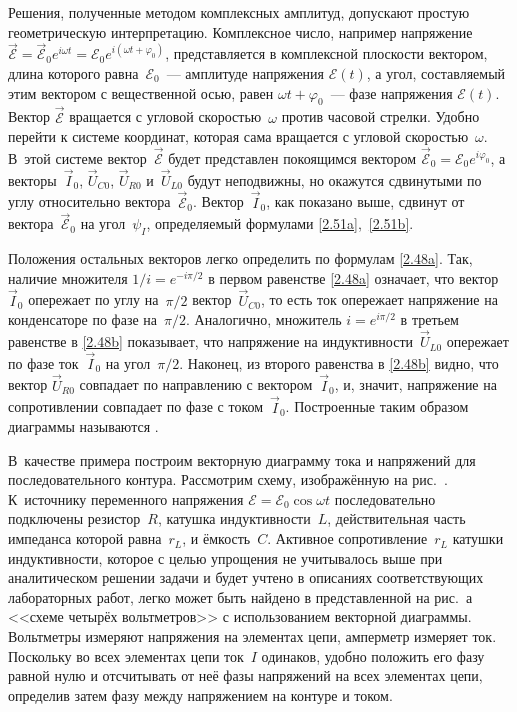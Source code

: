 Решения, полученные методом комплексных амплитуд, допускают простую
геометрическую интерпретацию. Комплексное число, например напряжение
$\vec{\mathcal{E}}=\vec{\mathcal{E}}_0e^{i\omega t}=\mathcal{E}_0e^{i(\omega
t+\varphi_0)}$, представляется в комплексной плоскости вектором, длина которого
равна~$\mathcal{E}_0$~--- амплитуде напряжения $\mathcal{E}(t)$, а угол,
составляемый этим вектором с вещественной осью, равен $\omega
t+\varphi_0$~--- фазе напряжения $\mathcal{E}(t)$. Вектор $\vec{\mathcal{E}}$
вращается с угловой скоростью~$\omega$ против часовой стрелки. Удобно перейти к
системе координат, которая сама вращается с угловой скоростью~$\omega$. В~этой
системе вектор~$\vec{\mathcal{E}}$ будет представлен покоящимся вектором
$\vec{\mathcal{E}}_0=\mathcal{E}_0e^{i\varphi_0}$, а векторы~$\vec I_0$, $\vec{U}_{\! C0}$,
$\vec{U}_{\! R0}$ и~$\vec{U}_{\! L0}$ будут неподвижны, но окажутся сдвинутыми по углу
относительно вектора~$\vec{\mathcal{E}}_0$. Вектор~$\vec I_0$, как показано выше,
сдвинут от вектора~$\vec{\mathcal{E}}_0$ на угол~$\psi_I$, определяемый формулами
\eqref{2.51a},~\eqref{2.51b}.

Положения остальных векторов легко определить по формулам \eqref{2.48a}. Так,
наличие множителя $1/i=e^{-i\pi/2}$ в первом равенстве \eqref{2.48a} означает,
что вектор~$\vec I_0$ опережает по углу на~$\pi/2$ вектор~$\vec{U}_{\! C0}$, то есть
ток опережает напряжение на конденсаторе по фазе на~$\pi/2$. Аналогично,
множитель $i=e^{i\pi/2}$ в третьем равенстве в \eqref{2.48b} показывает, что
напряжение на индуктивности~$\vec{U}_{\! L0}$ опережает по фазе ток~$\vec I_0$ на
угол~$\pi/2$. Наконец, из второго равенства в \eqref{2.48b} видно, что вектор
$\vec{U}_{\! R0}$ совпадает по направлению с вектором~$\vec I_0$, и, значит,
напряжение на сопротивлении совпадает по фазе с током~$\vec I_0$. Построенные
таким образом диаграммы называются .

В~качестве примера построим векторную диаграмму тока и напряжений для
последовательного контура. Рассмотрим схему, изображённую на рис.~.
К~источнику переменного напряжения $\mathcal{E}=\mathcal{E}_0\cos\omega t$
последовательно подключены резистор~$R$, катушка индуктивности~$L$,
действительная часть импеданса которой равна~$r_L$, и ёмкость~$C$. Активное
сопротивление~$r_L$ катушки индуктивности, которое с целью упрощения не
учитывалось выше при аналитическом решении задачи и будет учтено в описаниях
соответствующих лабораторных работ, легко может быть найдено в представленной на
рис.~а <<схеме четырёх вольтметров>> с использованием векторной диаграммы.
Вольтметры измеряют напряжения на элементах цепи, амперметр измеряет ток.
Поскольку во всех элементах цепи ток~$I$ одинаков, удобно положить его фазу
равной нулю и отсчитывать от неё фазы напряжений на всех элементах цепи,
определив затем фазу   между напряжением на контуре и током.


